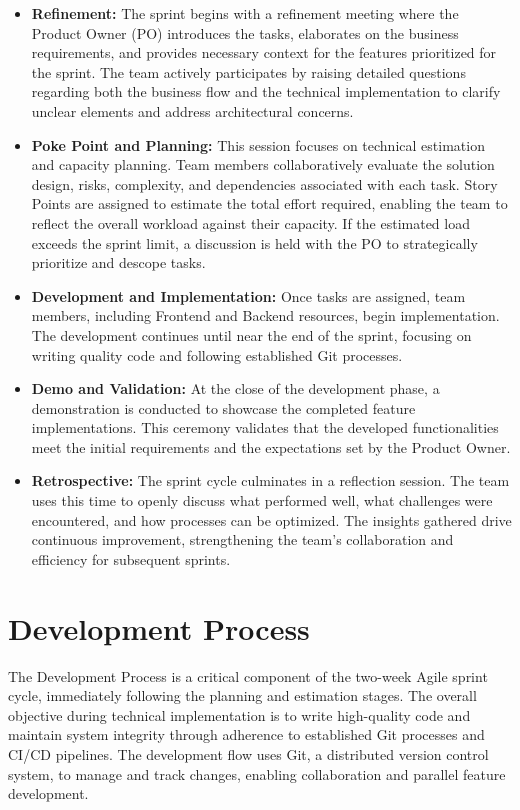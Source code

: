 \documentclass[12pt,oneside,openright,a4paper]{cpe-english-project}
\begin{document}
\begin{itemize}
\item
  \textbf{Refinement:} The sprint begins with a refinement meeting where
  the Product Owner (PO) introduces the tasks, elaborates on the
  business requirements, and provides necessary context for the features
  prioritized for the sprint. The team actively participates by raising
  detailed questions regarding both the business flow and the technical
  implementation to clarify unclear elements and address architectural
  concerns.
\item
  \textbf{Poke Point and Planning:} This session focuses on technical
  estimation and capacity planning. Team members collaboratively
  evaluate the solution design, risks, complexity, and dependencies
  associated with each task. Story Points are assigned to estimate the
  total effort required, enabling the team to reflect the overall
  workload against their capacity. If the estimated load exceeds the
  sprint limit, a discussion is held with the PO to strategically
  prioritize and descope tasks.
\item
  \textbf{Development and Implementation:} Once tasks are assigned, team
  members, including Frontend and Backend resources, begin
  implementation. The development continues until near the end of the
  sprint, focusing on writing quality code and following established Git
  processes.
\item
  \textbf{Demo and Validation:} At the close of the development phase, a
  demonstration is conducted to showcase the completed feature
  implementations. This ceremony validates that the developed
  functionalities meet the initial requirements and the expectations set
  by the Product Owner.
\item
  \textbf{Retrospective:} The sprint cycle culminates in a reflection
  session. The team uses this time to openly discuss what performed
  well, what challenges were encountered, and how processes can be
  optimized. The insights gathered drive continuous improvement,
  strengthening the team's collaboration and efficiency for subsequent
  sprints.
\end{itemize}

\section{Development Process}

The Development Process is a critical component of the two-week Agile
sprint cycle, immediately following the planning and estimation stages.
The overall objective during technical implementation is to write
high-quality code and maintain system integrity through adherence to
established Git processes and CI/CD pipelines. The development flow uses
Git, a distributed version control system, to manage and track changes,
enabling collaboration and parallel feature development.
\end{document}

